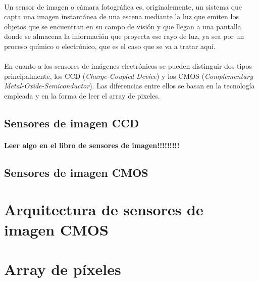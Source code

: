 \documentclass[12pt,a4paper,oneside,titlepage]{report}
\begin{document}
\paragraph{}
Un sensor de imagen o cámara fotográfica es, originalemente, un sistema que capta
una imagen instantánea de una escena mediante la luz que emiten los objetos que
se encuentran en su campo de visión y que llegan a una pantalla donde se almacena
la información que proyecta ese rayo de luz, ya sea por un proceso químico
o electrónico, que es el caso que se va a tratar aquí.

\paragraph{}
En cuanto a los sensores de imágenes electrónicos se pueden distinguir dos tipos
principalmente, los CCD (\textit{Charge-Coupled Device}) y los CMOS
(\textit{Complementary Metal-Oxide-Semiconductor}). Las diferencias entre ellos
se basan en la tecnología empleada y en la forma de leer el array de pixeles.

\subsection{Sensores de imagen CCD}

\paragraph{}
\huge{\textbf{Leer algo en el libro de sensores de imagen!!!!!!!!!}}

\subsection{Sensores de imagen CMOS}

\paragraph{}


\section{Arquitectura de sensores de imagen CMOS}

\section{Array de píxeles}
\end{document}

